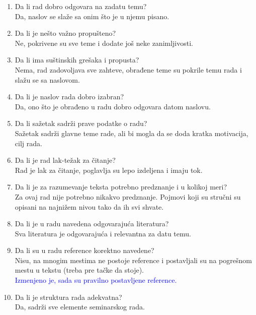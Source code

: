 \documentclass[a4paper]{report}
\newcommand{\odgovor}[1]{\textcolor{blue}{#1}}
\begin{document}
\begin{enumerate}
\item Da li rad dobro odgovara na zadatu temu?\\
Da, naslov se slaže sa onim što je u njemu pisano.

\item Da li je nešto važno propušteno?\\
Ne, pokrivene su sve teme i dodate još neke zanimljivosti.

\item Da li ima suštinskih grešaka i propusta?\\
Nema, rad zadovoljava sve zahteve, obrađene teme su pokrile temu rada i slažu se sa naslovom.

\item Da li je naslov rada dobro izabran?\\
Da, ono što je obrađeno u radu dobro odgovara datom naslovu.

\item Da li sažetak sadrži prave podatke o radu?\\
Sažetak sadrži glavne teme rade, ali bi mogla da se doda kratka motivacija, cilj rada.

\item Da li je rad lak-težak za čitanje?\\
Rad je lak za čitanje, poglavlja su lepo izdeljena i imaju tok.

\item Da li je za razumevanje teksta potrebno predznanje i u kolikoj meri?\\
Za ovaj rad nije potrebno nikakvo predznanje. Pojmovi koji su stručni su opisani na najnižem nivou tako da ih svi shvate.

\item Da li je u radu navedena odgovarajuća literatura?\\
Sva literatura je odgovarajuća i relevantna za datu temu. 

\item Da li su u radu reference korektno navedene?\\
Nisu, na mnogim mestima ne postoje reference i postavljali su na pogrešnom mestu u tekstu (treba pre tačke da stoje). \\
\odgovor{Izmenjeno je, sada su pravilno postavljene reference.}

\item Da li je struktura rada adekvatna?\\
Da, sadrži sve elemente seminarskog rada.


\end{enumerate}
\end{document}

